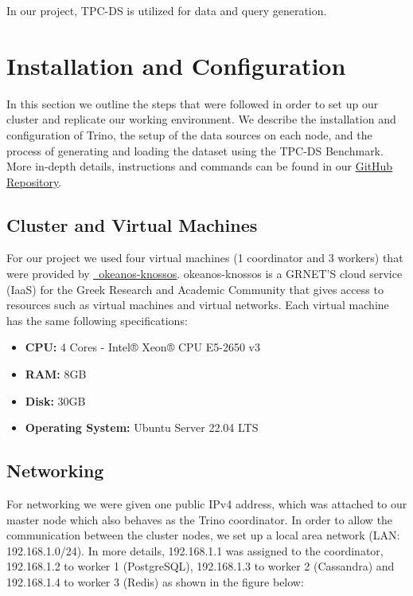 \documentclass[conference]{IEEEtran}
\begin{document}
In our project, TPC-DS is utilized for data and query generation.

\section{Installation and Configuration}

In this section we outline the steps that were followed in order to set up our cluster and replicate our working
environment. We describe the installation and configuration of Trino, the setup of the data sources
on each node, and the process of generating and loading the dataset using the TPC-DS Benchmark.
More in-depth details, instructions and commands can be found in our \textcolor{linkblue}{\underline{\href{https://github.com/alex1on/Information-Systems-NTUA}{GitHub Repository}}}.
\subsection{Cluster and Virtual Machines}
\label{sec:cluster-and-virtual-machines}

For our project we used four virtual machines (1 coordinator and 3 workers) that were provided by \textcolor{linkblue}{\underline{\href{https://okeanos-knossos.grnet.gr/home/}{~okeanos-knossos}}}.
okeanos-knossos is a GRNET'S cloud service (IaaS) for the Greek Research and Academic Community that gives access to resources such as
virtual machines and virtual networks. Each virtual machine has the same following specifications:

\begin{itemize}
    \item \textbf{CPU:} 4 Cores - Intel® Xeon® CPU E5-2650 v3
    \item \textbf{RAM:} 8GB
    \item \textbf{Disk:} 30GB
    \item \textbf{Operating System:} Ubuntu Server 22.04 LTS
\end{itemize}

\subsection{Networking}

For networking we were given one public IPv4 address, which was attached to our master node which also behaves as the Trino coordinator.
In order to allow the communication between the cluster nodes, we set up a local area network (LAN: 192.168.1.0/24). In more details,
192.168.1.1 was assigned to the coordinator, 192.168.1.2 to worker 1 (PostgreSQL), 192.168.1.3 to worker 2 (Cassandra) and 192.168.1.4 to worker 3 (Redis)
as shown in the figure below:
\end{document}
